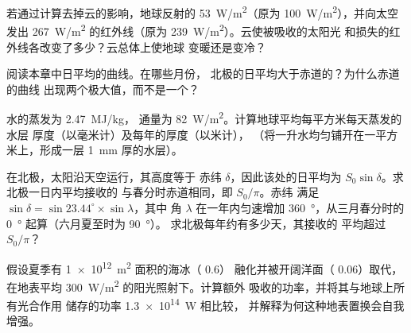 \begin{exercise}[$\star\star$]\label{exo:g10:earth-energy-budget:10}
若通过计算去掉云的影响，地球反射的
\qty{53}{W/m^2}（原为 \qty{100}{W/m^2}），并向太空发出 \qty{267}{W/m^2}
的红外线（原为 \qty{239}{W/m^2}）。云使被吸收的太阳光
和损失的红外线各改变了多少？云总体上使地球
变暖还是变冷？
\end{exercise}

\begin{exercise}[$\star\star$]\label{exo:g10:earth-energy-budget:11}
阅读本章中日平均的曲线。在哪些月份，
北极的日平均大于赤道的？为什么赤道的曲线
出现两个极大值，而不是一个？
\end{exercise}

\begin{exercise}[$\star\star\star$]\label{exo:g10:earth-energy-budget:12}
水的蒸发为 \qty{2.47}{MJ/kg}，
通量为 \qty{82}{W/m^2}。计算地球平均每平方米每天蒸发的水层
厚度（以毫米计）及每年的厚度（以米计），
（将一升水均匀铺开在一平方米上，形成一层
\qty{1}{mm} 厚的水层）。
\end{exercise}

\begin{exercise}[$\star\star\star$]\label{exo:g10:earth-energy-budget:13}
在北极，太阳沿天空运行，其高度等于
赤纬 $\delta$，因此该处的日平均为 $S_0 \sin
\delta$。求北极一日内平均接收的
与春分时赤道相同，即 $S_0/\pi$。赤纬
满足 $\sin\delta = \sin 23.44^\circ \times \sin\lambda$，其中
角 $\lambda$ 在一年内匀速增加 \qty{360}{\degree}，从三月春分时的
\qty{0}{\degree} 起算（六月夏至时为 \qty{90}{\degree}）。
求北极每年约有多少天，其接收的
平均超过 $S_0/\pi$？
\end{exercise}

\begin{exercise}[$\star\star\star$]\label{exo:g10:earth-energy-budget:14}
假设夏季有 \qty{1e12}{m^2} 面积的海冰（ 0.6）
融化并被开阔洋面（ 0.06）取代，在地表平均
\qty{300}{W/m^2} 的阳光照射下。计算额外
吸收的功率，并将其与地球上所有光合作用
储存的功率 \qty{1.3e14}{W} 相比较，
并解释为何这种地表置换会自我增强。
\end{exercise}

